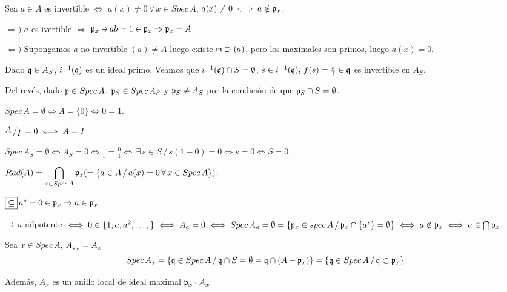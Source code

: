 \begin{prop}    
    Sea $a\in A$ es invertible $\iff$ $a(x) \neq 0 \, \forall \, x\in Spec\, A$, $a(x) \neq 0 \iff a\notin \mathfrak{p}_x$. 
\end{prop}
\begin{dem}
    $\Rightarrow)$ $a$ es ivertible $\iff$ $\mathfrak{p}_x\ni ab=1\in \mathfrak{p}_x\Rightarrow \mathfrak{p}_x=A$

    $\Leftarrow)$ Supongamos $a$ no invertible $(a)\neq A$ luego existe $\mathfrak{m} \supset (a)$, pero los maximales son primos, luego $a(x) = 0$. 
\end{dem}
\begin{obs}
    Dado $\mathfrak{q} \in A_S$, $i^{-1}(\mathfrak{q})$ es un ideal primo. Veamos que $i^{-1}(\mathfrak{q}) \cap S = \emptyset$, $s\in i^{-1}(\mathfrak{q}), \, f(s) = \frac{s}{1} \in \mathfrak{q}$ es invertible en $A_S$. 

    Del revés, dado $\mathfrak{p} \in Spec\, A$, $\mathfrak{p}_S \in Spec\, A_S$ y $\mathfrak{p}_S \neq A_S$ por la condici\'on de que $\mathfrak{p}_S \cap S =\emptyset$. 
\end{obs}
\begin{prop}
    $Spec\, A = \emptyset \iff A = \{0\} \iff 0=1$. 

    $\modulo{A}{I} = 0 \iff A = I$

    $Spec\, A_S = \emptyset \iff A_S =0 \iff \frac{1}{1} = \frac{0}{1} \iff \, \exists \, s\in S \,/ \, s(1-0)=0 \iff s=0 \iff S=0$. 
\end{prop}
\begin{prop}
    $\displaystyle Rad(A)=\bigcap_{x\in Spec\, A} \mathfrak{p}_x (=\{a\in A \, /\, a(x)=0 \, \forall \, x \in Spec\, A \})$. 
\end{prop}
\begin{dem}
    $\boxed{\subseteq} \, a^s=0  \in \mathfrak{p}_x \Rightarrow a\in \mathfrak{p}_x$

    $\boxed{\supseteq} \, a$ nilpotente $\iff 0 \in \{1, a,a^2, \ldots,\} \iff A_a=0 \iff Spec\, A_a = \emptyset = \{\mathfrak{p}_x \in spec\, A \, / \, \mathfrak{p}_x \cap \{a^s\} = \emptyset\}  \iff a\notin \mathfrak{p}_x \iff a\in \bigcap \mathfrak{p}_x$. 
\end{dem}
\begin{ejem}
Sea $x\in Spec\, A$, $A_{\mathfrak{p}_x}=A_x$
$$Spec\, A_x = \{ \mathfrak{q} \in Spec\, A\, /\, \mathfrak{q}\cap S = \emptyset = \mathfrak{q}\cap (A-\mathfrak{p}_x)\} = \{\mathfrak{q} \in Spec\, A\,/ \, \mathfrak{q}\subset \mathfrak{p}_x \}$$

Adem\'as, $A_x$ es un anillo local de ideal maximal $\mathfrak{p}_x \cdot A_x$. 
\end{ejem}

